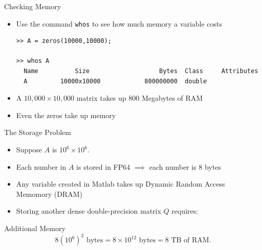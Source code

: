 \documentclass[10pt]{beamer}
\begin{document}

\begin{frame}[fragile]{Checking Memory}
\begin{itemize}

    \item Use the command \texttt{whos} to see how much memory a variable costs

    \begin{lstlisting}
>> A = zeros(10000,10000);

>> whos A
  Name          Size                   Bytes  Class     Attributes
  A         10000x10000            800000000  double           
\end{lstlisting}
    \vfill
    \item A $10,000\times10,000$ matrix takes up 800 Megabytes of RAM
    \vfill
    \item Even the zeros take up memory 
    \vfill 
\end{itemize}
\end{frame}
\begin{frame}{The Storage Problem}

\begin{itemize}
    \item Suppose $A$ is $10^6\times10^6$.
    \vfill 
    \item Each number in $A$ is stored in FP64 $\implies$ each number is 8 bytes
    \vfill 
    \item Any variable created in Matlab takes up Dynamic Random Access Memomory (DRAM)
    \vfill 
    \item Storing another dense double-precision matrix $Q$
    requires:
\end{itemize}

\begin{block}{Additional Memory}
\[
    8(10^6)^2 \text{ bytes}
    =8\times10^{12}\text{ bytes}
    =\boxed{8\text{ TB of RAM}}. 
\]
\end{block}


\end{frame}
\end{document}
